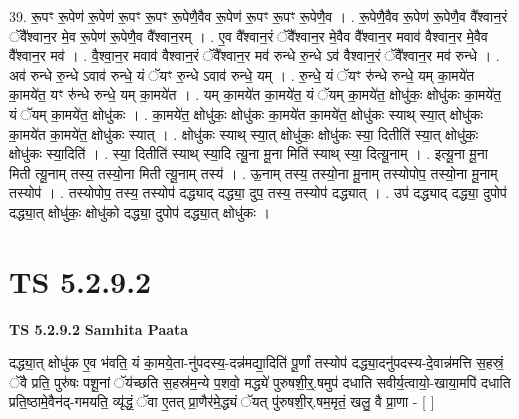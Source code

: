 \documentclass[17pt]{extarticle}
\begin{document}
39. रू॒पꣳ रू॒पेण॑ रू॒पेण॑ रू॒पꣳ रू॒पꣳ रू॒पेणै॒वैव रू॒पेण॑ रू॒पꣳ रू॒पꣳ रू॒पेणै॒व । . रू॒पेणै॒वैव रू॒पेण॑ रू॒पेणै॒व वै᳚श्वान॒रं ॅवै᳚श्वान॒र मे॒व रू॒पेण॑ रू॒पेणै॒व वै᳚श्वान॒रम् । . ए॒व वै᳚श्वान॒रं ॅवै᳚श्वान॒र मे॒वैव वै᳚श्वान॒र मवाव॑ वैश्वान॒र मे॒वैव वै᳚श्वान॒र मव॑ । . वै॒श्वा॒न॒र मवाव॑ वैश्वान॒रं ॅवै᳚श्वान॒र मव॑ रुन्धे रु॒न्धे ऽव॑ वैश्वान॒रं ॅवै᳚श्वान॒र मव॑ रुन्धे । . अव॑ रुन्धे रु॒न्धे ऽवाव॑ रुन्धे॒ यं ॅयꣳ रु॒न्धे ऽवाव॑ रुन्धे॒ यम् । . रु॒न्धे॒ यं ॅयꣳ रु॑न्धे रुन्धे॒ यम् का॒मये॑त का॒मये॑त॒ यꣳ रु॑न्धे रुन्धे॒ यम् का॒मये॑त । . यम् का॒मये॑त का॒मये॑त॒ यं ॅयम् का॒मये॑त॒ क्षोधु॑कः॒ क्षोधु॑कः का॒मये॑त॒ यं ॅयम् का॒मये॑त॒ क्षोधु॑कः । . का॒मये॑त॒ क्षोधु॑कः॒ क्षोधु॑कः का॒मये॑त का॒मये॑त॒ क्षोधु॑कः स्याथ् स्या॒त् क्षोधु॑कः का॒मये॑त का॒मये॑त॒ क्षोधु॑कः स्यात् । . क्षोधु॑कः स्याथ् स्या॒त् क्षोधु॑कः॒ क्षोधु॑कः स्या॒ दितीति॑ स्या॒त् क्षोधु॑कः॒ क्षोधु॑कः स्या॒दिति॑ । . स्या॒ दितीति॑ स्याथ् स्या॒दि त्यू॒ना मू॒ना मिति॑ स्याथ् स्या॒ दित्यू॒नाम् । . इत्यू॒ना मू॒ना मिती त्यू॒नाम् तस्य॒ तस्यो॒ना मिती त्यू॒नाम् तस्य॑ । . ऊ॒नाम् तस्य॒ तस्यो॒ना मू॒नाम् तस्योपोप॒ तस्यो॒ना मू॒नाम् तस्योप॑ । . तस्योपोप॒ तस्य॒ तस्योप॑ दद्ध्याद् दद्ध्या॒ दुप॒ तस्य॒ तस्योप॑ दद्ध्यात् । . उप॑ दद्ध्याद् दद्ध्या॒ दुपोप॑ दद्ध्या॒त् क्षोधु॑कः॒ क्षोधु॑को दद्ध्या॒ दुपोप॑ दद्ध्या॒त् क्षोधु॑कः । \newline
\pagebreak
{}

\section{ TS 5.2.9.2 }

\textbf{TS 5.2.9.2 } \newline
\textbf{Samhita Paata} \newline

दद्ध्या॒त् क्षोधु॑क ए॒व भ॑वति॒ यं का॒मये॒ता-नु॑पदस्य॒-दन्न॑मद्या॒दिति॑ पू॒र्णां तस्योप॑ दद्ध्या॒दनु॑पदस्य-दे॒वान्न॑मत्ति स॒हस्रं॒ ॅवै प्रति॒ पुरु॑षः पशू॒नां ॅय॑च्छति स॒हस्र॑म॒न्ये प॒शवो॒ मद्ध्ये॑ पुरुषशी॒र्॒.षमुप॑ दधाति सवीर्य॒त्वायो॒-खाया॒मपि॑ दधाति प्रति॒ष्ठामे॒वैन॑द्-गमयति॒ व्यृ॑द्धं॒ ॅवा ए॒तत् प्रा॒णैर॑मे॒द्ध्यं ॅयत् पु॑रुषशी॒र्.षम॒मृतं॒ खलु॒ वै प्रा॒णा - [  ] \newline
\end{document}
